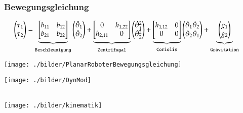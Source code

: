 \begin{minipage}{0.75\linewidth}
    \subsubsection{Bewegungsgleichung}
    \vspace{-0.5cm}
    \[\hspace{-0.5cm}\begin{pmatrix}
        \tau_1\\
        \tau_2
    \end{pmatrix}=
    \underbrace{
    \begin{bmatrix}
    b_{11}&b_{12}\\
    b_{21}&b_{22}
    \end{bmatrix}}_{\texttt{Beschleunigung}}
    \begin{pmatrix}
    \ddot{\theta}_1\\
    \ddot{\theta}_2
    \end{pmatrix}+
    \underbrace{
    \begin{bmatrix}
    0 &h_{1,22}\\
    h_{2,11}&0\\
    \end{bmatrix}}_{\texttt{Zentrifugal}}
    \begin{pmatrix}
    \dot{\theta}_1^2\\
    \dot{\theta}_2^2
    \end{pmatrix}+
    \underbrace{
    \begin{bmatrix}
    h_{1,12} & 0\\
    0&0\\
    \end{bmatrix}}_{\texttt{Coriolis}}
    \begin{pmatrix}
    \dot{\theta}_1 \dot{\theta}_2\\
    \dot{\theta}_2 \dot{\theta}_1
    \end{pmatrix} +
    \underbrace{
    \begin{pmatrix}
    g_1\\
    g_2\\
    \end{pmatrix}}_{\texttt{Gravitation}}
    \]
\end{minipage}
\begin{minipage}{0.25\linewidth}
    \texttt{[image: ./bilder/PlanarRoboterBewegungsgleichung]}
\end{minipage}

\begin{minipage}{0.7\linewidth}
    \texttt{[image: ./bilder/DynMod]}
\end{minipage}\\
\texttt{[image: ./bilder/kinematik]}


